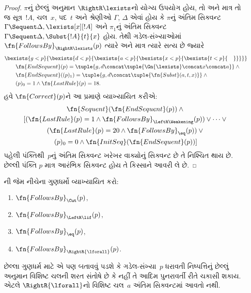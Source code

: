 \begin{proof}
$\pi$નું છેલ્લું અનુમાન
$\RightR\lexists$નો યોગ્ય ઉપયોગ હોય,
તો અને માત્ર તો જ સૂત્ર~$!A$,
ચલ~$x$, પદ~$t$ અને શ્રેણીઓ
$\Gamma$, $\Delta$ એવાં હોય કે
$\pi$નું અંતિમ સિક્વન્ટ
$\Gamma \Sequent \Delta, \lexists[x][!A]$
અને $\pi_1$નું અંતિમ સિક્વન્ટ
$\Gamma \Sequent \Delta,
\Subst{!A}{t}{x}$ હોય. તેથી
ગડેલ-સંખ્યાઓમાં
$\fn{FollowsBy}_{\RightR\lexists}(p)$
ત્યારે અને માત્ર ત્યારે સત્ય છે જ્યારે
\begin{align*}
  & \bexists{g<p}{\bexists{d<p}{\bexists{a<p}{\bexists{x<p}{\bexists{t<p}{\quad}}}}}\\
  & \qquad \fn{EndSequent}(p) = 
  \tuple{
    g,
    d \concat \tuple{\Gn{\lexists} \concat x \concat a}
  } \land {}\\
  & \qquad \fn{EndSequent}((p)_1) = 
  \tuple{
    g,
    d \concat \tuple{\fn{Subst}(a, t, x)}
  } \land {}\\
  & \qquad (p)_0 = 1 \land \fn{LastRule}(p) = 18.
\end{align*}
હવે $\fn{Correct}(p)$ને આ પ્રમાણે
વ્યાખ્યાયિત કરીએ:
\begin{multline*}
  \fn{Sequent}(\fn{EndSequent}(p)) \land {}\\ 
  [(\fn{LastRule}(p) = 1 \land 
  \fn{FollowsBy}_{\LeftR\Weakening}(p)) \lor \dots \lor {}\\
  (\fn{LastRule}(p) = 20 \land \fn{FollowsBy}_{\eq}(p)) \lor {}\\
  (p)_0 = 0 \land \fn{InitSeq}(\fn{EndSequent}(p))]
\end{multline*}
પહેલી પંક્તિથી~$p$નું અંતિમ સિક્વન્ટ
ખરેખર વાક્યોનું સિક્વન્ટ છે
તે નિશ્ચિત થાય છે. છેલ્લી પંક્તિ
$p$ માત્ર આરંભિક સિક્વન્ટ હોય તે
કિસ્સાને આવરી લે છે.
\end{proof}

\begin{prob}
  ની
  જેમ નીચેના ગુણધર્મો વ્યાખ્યાયિત કરો:
  \begin{enumerate}
  \item $\fn{FollowsBy}_{\Cut}(p)$,
  \item $\fn{FollowsBy}_{\LeftR\lif}(p)$,
  \item $\fn{FollowsBy}_{\eq}(p)$,
  \item $\fn{FollowsBy}_{\RightR{\lforall}}(p)$.
  \end{enumerate}
  છેલ્લા ગુણધર્મ માટે એ પણ બતાવવું પડશે
  કે ગડેલ-સંખ્યા~$p$ ધરાવતી
  નિષ્પત્તિનું છેલ્લું અનુમાન
  વિશિષ્ટ ચલની શરત સંતોષે છે કે નહીં
  તે આદિમ પુનરાવર્તી રીતે ચકાસી શકાય.
  એટલે $\RightR{\lforall}$નો વિશિષ્ટ
  ચલ~$a$ અંતિમ સિક્વન્ટમાં આવતો નથી.
  \end{prob}
  

